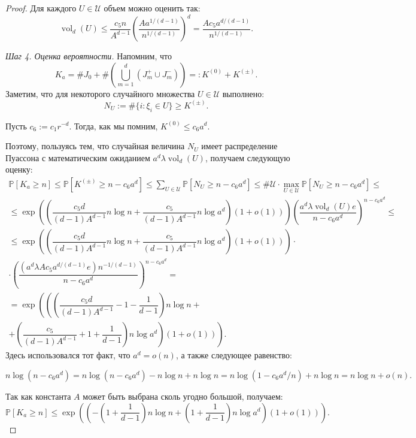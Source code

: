 \documentclass[12pt]{article}
\theoremstyle{plain}
\theoremstyle{definition}
\theoremstyle{remark}
\def\geq{\geqslant}
\def\leq{\leqslant}
\DeclareMathOperator{\vol}{vol}
\newcommand{\PP}{\mathbb{P}}
\begin{document}
\begin{proof}
Для каждого $U\in \mathcal{U}$ объем можно оценить так: $$\vol_d (U)\leq \dfrac{c_5n}{A^{d-1}}\left(\dfrac{Aa^{1/(d-1)}}{n^{1/(d-1)}}\right)^d = \dfrac{Ac_5a^{d/(d-1)}}{n^{1/(d-1)}}.$$

{\it Шаг 4. Оценка вероятности.} Напомним, что $$K_a = \#J_0 + \#\left(\bigcup_{m=1}^d (J_m^+ \cup J_m^-)\right) =: K^{(0)} + K^{(\pm)}.$$
Заметим, что для некоторого случайного множества $U\in\mathcal{U}$ выполнено: $$N_U := \#\{i\colon \xi_i\in U\} \geq K^{(\pm)}.$$

Пусть $c_6 := c_1r^{-d}$. Тогда, как мы помним, $K^{(0)}\leq c_6a^d.$

Поэтому, пользуясь тем, что случайная величина $N_U$  имеет распределение Пуассона с математическим ожиданием $a^d\lambda\vol_d(U)$, получаем следующую оценку: 
\begin{multline*}
    \PP[K_a\geq n] \leq \PP[K^{(\pm)} \geq n-c_6a^d] \leq \sum_{U\in\mathcal{U}}\PP[N_U \geq n-c_6a^d] \leq
    \#\mathcal{U}\cdot\max_{U\in\mathcal{U}}\PP[N_U\geq n- c_6a^d] \leq \\
    \leq  \exp \left(\left(\dfrac{c_5d}{(d-1)A^{d-1}}n\log n + \dfrac{c_5}{(d-1)A^{d-1}}n\log a^d\right)(1+o(1))\right) \left(\dfrac{a^d\lambda\vol_d(U)e}{n-c_6a^d}\right)^{n-c_6a^d} \leq \\
    \leq 
    \exp \left(\left(\dfrac{c_5d}{(d-1)A^{d-1}}n\log n + \dfrac{c_5}{(d-1)A^{d-1}}n\log a^d\right)(1+o(1))\right)\cdot\\
    \cdot\left(\dfrac{(a^d\lambda Ac_5a^{d/(d-1)}e)n^{-1/(d-1)}}{n-c_6a^d}\right)^{n-c_6a^d} = \\
    = \exp \left(\left(\left(\dfrac{c_5d}{(d-1)A^{d-1}} - 1 - \dfrac{1}{d-1}\right)n\log n + \right.\right.\\
    +\left.\left.\left(\dfrac{c_5}{(d-1)A^{d-1}} + 1 + \dfrac{1}{d-1}\right)n\log a^d\right)(1+o(1))\right).
\end{multline*}{}
Здесь использовался тот факт, что $a^d = o(n)$, а также следующее равенство:

\begin{equation*}
    n\log (n - c_6a^d) = n\log (n - c_6a^d) - n\log n + n\log n = n\log (1 - c_6a^d/n) + n\log n = n\log n + o(n).
\end{equation*}{}

Так как константа $A$ может быть выбрана сколь угодно большой, получаем:
\begin{equation*}
    \PP[K_a \geq n] \leq 
     \exp \left(\left(-\left(1+\dfrac{1}{d-1}\right)n\log n + \left(1+\dfrac{1}{d-1}\right)n\log a^d \right)(1+o(1))\right).
\end{equation*}{}
\end{proof}{}
\end{document}
